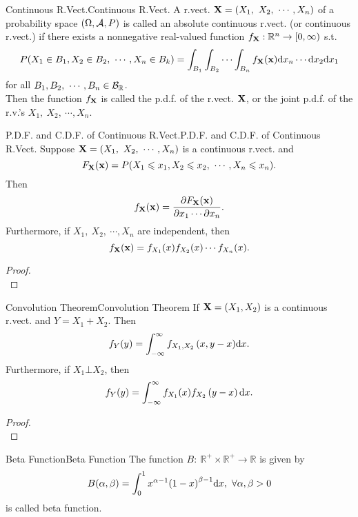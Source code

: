 \documentclass{elegantbook}
\begin{document}
\begin{definition}{Continuous R.Vect.}{Continuous R.Vect.}
A r.vect. $\mathbf{X}=(X_1,\ X_2,\ \cdots,X_n)$ of a probability space $(\Omega,\mathcal{A}, P)$ is called an absolute continuous r.vect. (or continuous r.vect.) if there exists a nonnegative real-valued function $f_{\mathbf{X}}:\mathbb{R}^n\rightarrow[0,\infty)$ s.t.
$$
P(X_1\in B_1,X_2\in B_2,\ \cdots,X_n\in B_k)=\int_{B_1}\int_{B_2}{\cdots\int_{B_n}{f_{\mX}(\mx)\dif x_n}}\cdots \dif x_2\dif x_1
$$
for all $B_1,B_2,\ \cdots,B_n\in\mb_\mathbb{R}$.\\
Then the function $f_{\mathbf{X}}$ is called the p.d.f. of the r.vect. $\mathbf{X}$, or the joint p.d.f. of the r.v.'s $X_1,\ X_2,\ \cdots,X_n$.
\end{definition}

\begin{theorem}{P.D.F. and C.D.F. of Continuous R.Vect.}{P.D.F. and C.D.F. of Continuous R.Vect.}
Suppose $\mathbf{X}=(X_1,\ X_2,\ \cdots,X_n)$ is a continuous r.vect. and 
$$
F_{\mX}(\mx)=P(X_1\ls x_1,X_2\ls x_2,\ \cdots,X_n\ls x_n).
$$
Then
$$
f_{\mathbf{X}}(\mathbf{x})=\frac{\partial F_{\mathbf{X}}(\mathbf{x})}{\partial x_1\cdots\partial x_n}.
$$
Furthermore, if $X_1,\ X_2,\ \cdots,X_n$ are independent, then
$$
f_{\mathbf{X}}(\mathbf{x})=f_{X_1}(x)f_{X_2}(x)\cdots f_{X_n}(x).
$$
\end{theorem}

\begin{proof}
\\[4cm]\vspace{0.01cm}
\end{proof}

\begin{theorem}{Convolution Theorem}{Convolution Theorem}
If $\mathbf{X}=(X_1,X_2)$ is a continuous r.vect. and $Y=X_1+X_2$. Then
$$
f_Y(y)=\int_{-\infty}^{\infty}{f_{X_1,X_2}\left(x,y-x\right)}\dif x.
$$
Furthermore, if $X_1\bot X_2$, then
$$
f_Y(y)=\int_{-\infty}^{\infty}{f_{X_1}(x)}f_{X_2}\left(y-x\right)\dif x.
$$
\end{theorem}

\begin{proof}
\\[4cm]\vspace{0.01cm}
\end{proof}

\begin{definition}{Beta Function}{Beta Function}
The function $B:\ \mathbb{R}^+\times\mathbb{R}^+\rightarrow\mathbb{R}$ is given by
$$
B(\alpha,\beta)=\int_{0}^{1}x^{\alpha-1}{(1-x)}^{\beta-1}\dif x,\ \forall\alpha,\beta>0
$$
is called beta function.
\end{definition}
\end{document}
